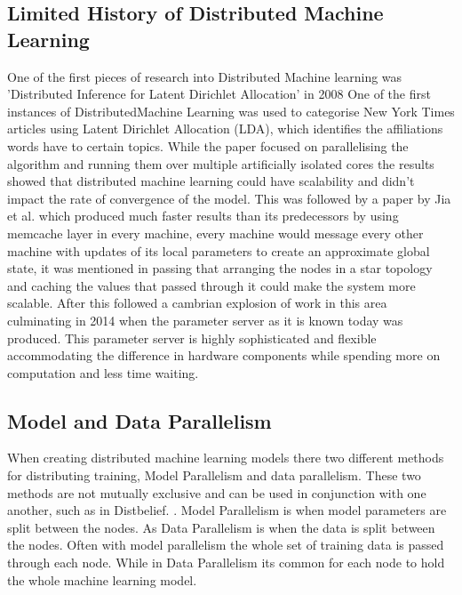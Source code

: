 \subsection{Limited History of Distributed Machine Learning}
One of the first pieces of research into Distributed Machine learning was
’Distributed Inference for Latent Dirichlet Allocation’ in 2008
\cite{newman2008distributed} One of the first instances of DistributedMachine
Learning  was  used  to  categorise  New York  Times  articles  using  Latent
Dirichlet Allocation (LDA), which identifies the affiliations words have to
certain topics.  While the paper focused on parallelising the algorithm and
running them over multiple artificially isolated cores the results showed that
distributed machine learning could have scalability and didn’t impact the rate
of convergence of the model.  This was followed by a paper by Jia et al.
\cite{ParallelTopicModels} which produced much faster results than its
predecessors by using memcache layer in every machine, every machine would
message every other machine with updates of its local parameters to create an
approximate global state, it was mentioned in passing that arranging the nodes
in a star topology and caching the values that passed through it could make the
system more scalable. After this followed a cambrian explosion of work in this
area \cite{Ahmed2012YahooLDA, li2014communication, Dean2012Distbelief,
googlemapreduce2008} culminating in 2014 when the parameter server as it is
known today \cite{LI2014ParameterServers} was produced. This parameter server is
highly sophisticated and flexible accommodating the difference in hardware
components while spending more on computation and less time waiting.



\subsection{Model and Data Parallelism}
When creating distributed machine learning models there two different methods
for distributing training, Model Parallelism and data parallelism. These two
methods are not mutually exclusive and can be used in conjunction with one
another, such as in Distbelief. \cite{Dean2012Distbelief}. Model Parallelism is
when model parameters are split between the nodes. As Data Parallelism is when
the data is split between the nodes. \cite{Xing2015Petuum} Often with model
parallelism the whole set of training data is passed through each node. While in
Data Parallelism its common for each node to hold the whole machine learning
model.

